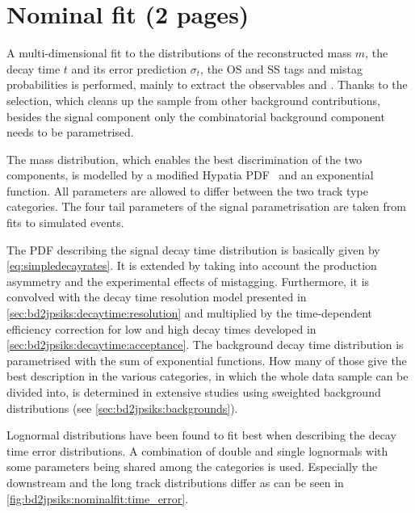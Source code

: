 
\section{Nominal fit (2 pages)}
\label{sec:bd2jpsiks:nominalfit}

A multi-dimensional fit to the distributions of the reconstructed mass $m$,
the decay time $t$ and its error prediction $\sigma_t$, the OS and SS\pion
tags and mistag probabilities is performed, mainly to extract the \CP
observables \SJpsiKS and \CJpsiKS. Thanks to the selection, which cleans up
the sample from other background contributions, besides the signal component
only the combinatorial background component needs to be parametrised.

The mass distribution, which enables the best discrimination of the two
components, is modelled by a modified Hypatia PDF~\cite{Santos:2013ky} and an
exponential function. All parameters are allowed to differ between the two
track type categories. The four tail parameters of the signal parametrisation
are taken from fits to simulated events.

The PDF describing the signal decay time distribution is basically given by
\cref{eq:simpledecayrates}. It is extended by taking into account
the production asymmetry and the experimental effects of mistagging.
Furthermore, it is convolved with the decay time resolution model presented in
\cref{sec:bd2jpsiks:decaytime:resolution} and multiplied by the time-dependent
efficiency correction for low and high decay times developed in
\cref{sec:bd2jpsiks:decaytime:acceptance}. The background decay time
distribution is parametrised with the sum of exponential functions. How many
of those give the best description in the various categories, in which the
whole data sample can be divided into, is determined in extensive studies
using sweighted background distributions (see
\cref{sec:bd2jpsiks:backgrounds}).

Lognormal distributions have been found to fit best when describing the decay
time error distributions. A combination of double and single lognormals with
some parameters being shared among the categories is used. Especially the
downstream and the long track distributions differ as can be seen in
\cref{fig:bd2jpsiks:nominalfit:time_error}.

